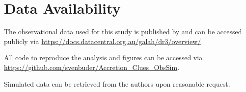 \documentclass[fleqn,usenatbib]{mnras}
\begin{document}
\section*{Data Availability}

The observational data used for this study is published by \citet{Buder2021} and can be accessed publicly via \url{https://docs.datacentral.org.au/galah/dr3/overview/}

All code to reproduce the analysis and figures can be accessed via \url{https://github.com/svenbuder/Accretion_Clues_ObsSim}.

Simulated data can be retrieved from the authors upon reasonable request.







\bsp	%
\label{lastpage}
\end{document}
